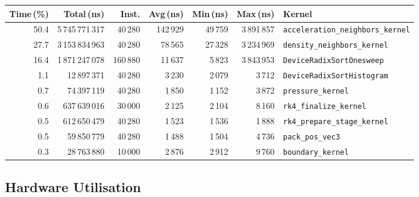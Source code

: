 \documentclass[11pt,a4paper]{article}
\begin{document}
\vspace{4pt}
{\footnotesize
\begin{tabularx}{\linewidth}{rrrrrrl}
  \toprule
  \textbf{Time\,(\%)} & \textbf{Total\,(ns)} & \textbf{Inst.} &
  \textbf{Avg\,(ns)} & \textbf{Min\,(ns)} & \textbf{Max\,(ns)} &
  \textbf{Kernel} \\
  \midrule
  50.4 & 5\,745\,771\,317 & 40\,280 & 142\,929 & 49\,759 & 3\,891\,857 &
    \texttt{acceleration\_neighbors\_kernel} \\
  27.7 & 3\,153\,834\,963 & 40\,280 & 78\,565  & 27\,328 & 3\,234\,969 &
    \texttt{density\_neighbors\_kernel} \\
  16.4 & 1\,871\,247\,078 & 160\,880 & 11\,637 & 5\,823 & 3\,843\,953 &
    \texttt{DeviceRadixSortOnesweep} \\
   1.1 & 12\,897\,371 & 40\,280 & 3\,230 & 2\,079 & 3\,712 &
    \texttt{DeviceRadixSortHistogram} \\
   0.7 & 74\,397\,119 & 40\,280 & 1\,850 & 1\,152 & 3\,872 &
    \texttt{pressure\_kernel} \\
   0.6 & 637\,639\,016 & 30\,000 & 2\,125 & 2\,104 & 8\,160 &
    \texttt{rk4\_finalize\_kernel} \\
   0.5 & 612\,650\,479 & 40\,280 & 1\,523 & 1\,536 & 1\,888 &
    \texttt{rk4\_prepare\_stage\_kernel} \\
   0.5 & 59\,850\,779 & 40\,280 & 1\,488 & 1\,504 & 4\,736 &
    \texttt{pack\_pos\_vec3} \\
   0.3 & 28\,763\,880 & 10\,000 & 2\,876 & 2\,912 & 9\,760 &
    \texttt{boundary\_kernel} \\
  \bottomrule
\end{tabularx}
}

\subsection{Hardware Utilisation}
\end{document}
